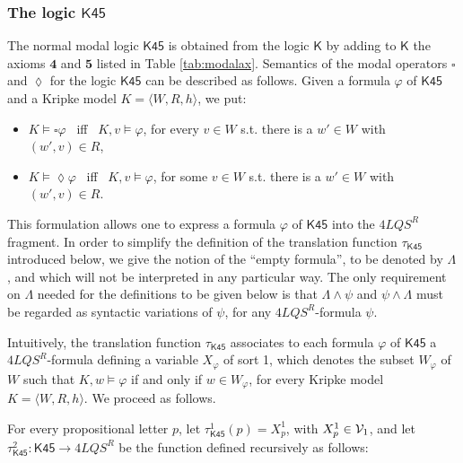 \documentclass{fundam}
\renewcommand{\And}{\wedge}
\newcommand{\Kr}{\mathit{K}}
\newcommand{\K}{\mathsf{K}}
\newcommand{\Ac}{\mathbf{5}}
\newcommand{\Aq}{\mathbf{4}}
\newcommand{\Kqc}{\mathsf{K45}}
\newcommand{\TKqc}{\tau_{\Kqc}}
\newcommand{\TKqcuno}{\tau_{\Kqc}^{1}}
\newcommand{\TKqcdue}{\tau_{\Kqc}^{2}}
\newcommand{\QLQSR}{\ensuremath{\mbox{$4\mathit{LQS}^{R}$}}\xspace}
\begin{document}
\subsubsection{The logic $\Kqc$}
The normal modal logic $\Kqc$ is obtained from the logic $\K$ by
adding to $\K$ the axioms
$\Aq$ and $\Ac$ listed in Table \ref{tab:modalax}.  Semantics of the
modal operators $\square$ and $\lozenge$ for the logic $\Kqc$ can be
described as follows.  Given a formula $\varphi$ of $\Kqc$ and a
Kripke model $\Kr = \langle W,R,h\rangle$, we put:
\begin{itemize}
\item $\Kr\models \square \varphi$ ~iff~ $\Kr,v \models \varphi$, for every $v \in W$ s.t. there is a $w' \in W$ with $(w',v)\in R$,
\item $\Kr\models \lozenge \varphi$ ~iff~ $\Kr,v \models \varphi$, for some $v \in W$ s.t. there is a $w' \in W$ with $(w',v)\in R$.
\end{itemize}
This formulation allows one to express a formula $\varphi$ of $\Kqc$
into the $\QLQSR$ fragment.  In order to simplify the definition of
the translation function $\TKqc$ introduced below, we give the notion
of the ``empty formula'', to be denoted by $\Lambda$, and which will
not be interpreted in any particular way.  The only requirement on
$\Lambda$ needed for the definitions to be given below is that
$\Lambda \And \psi$ and $\psi \And \Lambda$ must be regarded as
syntactic variations of $\psi$, for any $\QLQSR$-formula $\psi$.

Intuitively, the translation function $\TKqc$ associates to each formula $\varphi$
of $\Kqc$ a $\QLQSR$-formula defining a variable $X_{\varphi}$ of sort 1, which denotes
the subset $W_{\varphi}$ of $W$ such that $\Kr, w \models \varphi$ if and only if $w \in W_{\varphi}$, for every Kripke model
$\Kr = \langle W,R,h\rangle$. We proceed as follows.

For every propositional letter $p$, let $\TKqcuno(p) = X_{p}^{1}$,
with $X_{p}^{1}\in {\cal V}_1$, and let $\TKqcdue : \Kqc \rightarrow
\QLQSR$ be the function defined recursively as follows:
\end{document}
